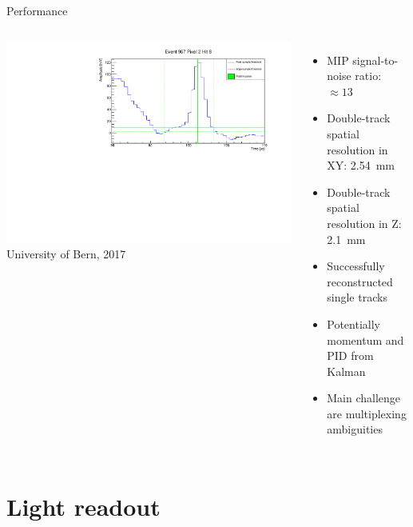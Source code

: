\documentclass[]{beamer}
\newcommand*{\emphcol}{blue}
\begin{document}
\begin{frame}{Performance}
	\begin{columns}[c]
		\centering
		\includegraphics[page=1, width=1.1\textwidth]{viper/event967_pixel2_hit8}\\
		{\tiny University of Bern, 2017}\\
		\begin{itemize}
			\item MIP signal-to-noise ratio: $\approx \num{13}$
			\item Double-track spatial resolution in XY: \SI{2.54}{\milli\metre}
			\item Double-track spatial resolution in Z: \SI{2.1}{\milli\metre}
			\item Successfully reconstructed single tracks
			\item Potentially momentum and PID from Kalman
			\item {\color{\emphcol} Main challenge are multiplexing ambiguities}
		\end{itemize}
	\end{columns}
\end{frame}

\section{Light readout}
\end{document}
